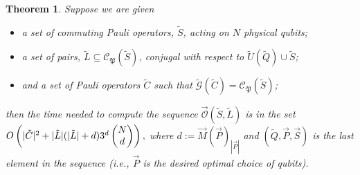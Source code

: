 \documentclass[twocolumn,showpacs,preprintnumbers,amsmath,amssymb,nofootinbib,pra,floatfix]{revtex4-1}
\newtheorem{theorem}{Theorem}
\newcommand{\lst}{\vec}
\newcommand{\set}{\tilde}
\newcommand{\genfun}{\tilde{\mathcal{G}}}
\newcommand{\pauligroup}{\mathfrak{P}}
\newcommand{\centralizer}{\mathcal{C}}
\newcommand{\optimizer}{\lst{\mathcal{O}}}
\begin{document}
\begin{theorem}
\label{theorem:bound on running time}
Suppose we are given
\begin{itemize}
\item a set of commuting Pauli operators, $\set S$, acting on $N$ physical qubits;
\item a set of pairs, $\set L\subseteq\centralizer_\pauligroup(\set S)$, conjugal with respect to $\set U(\set Q)\cup\set S$;
\item and a set of Pauli operators $\set C$ such that $\genfun(\set C)=\centralizer_\pauligroup(\set S)$;
\end{itemize}
then the time needed to compute the sequence $\optimizer(\set S,\set L)$ is in the set $O\paren{|\set C|^2+|\set L|(|\set L|+d)3^d\choose{N}{d}},$ where $d:=\lst M(\lst P)_{|\lst P|}$ and $(\set Q,\lst P,\lst S)$ is the last element in the sequence (i.e., $\lst P$ is the desired optimal choice of qubits).
\end{theorem}
\end{document}
